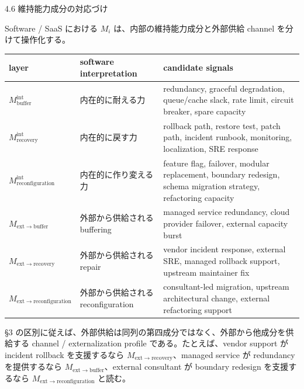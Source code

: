 \documentclass[12pt,a4paper]{article}
\begin{document}
4.6 維持能力成分の対応づけ

Software / SaaS における \(M_i\) は、内部の維持能力成分と外部供給 channel を分けて操作化する。

{\def\LTcaptype{table} %
\begin{longtable}[]{@{}
  >{\raggedright\arraybackslash}p{}
  >{\raggedright\arraybackslash}p{}
  >{\raggedright\arraybackslash}p{}@{}}
\toprule\noalign{}
\begin{minipage}[b]{\linewidth}\raggedright
layer
\end{minipage} & \begin{minipage}[b]{\linewidth}\raggedright
software interpretation
\end{minipage} & \begin{minipage}[b]{\linewidth}\raggedright
candidate signals
\end{minipage} \\
\midrule\noalign{}
\endhead
\bottomrule\noalign{}
\endlastfoot
\(M_{\mathrm{buffer}}^{\mathrm{int}}\) & 内在的に耐える力 & redundancy, graceful degradation, queue/cache slack, rate limit, circuit breaker, spare capacity \\
\(M_{\mathrm{recovery}}^{\mathrm{int}}\) & 内在的に戻す力 & rollback path, restore test, patch path, incident runbook, monitoring, localization, SRE response \\
\(M_{\mathrm{reconfiguration}}^{\mathrm{int}}\) & 内在的に作り変える力 & feature flag, failover, modular replacement, boundary redesign, schema migration strategy, refactoring capacity \\
\(M_{\mathrm{ext}\to\mathrm{buffer}}\) & 外部から供給される buffering & managed service redundancy, cloud provider failover, external capacity burst \\
\(M_{\mathrm{ext}\to\mathrm{recovery}}\) & 外部から供給される repair & vendor incident response, external SRE, managed rollback support, upstream maintainer fix \\
\(M_{\mathrm{ext}\to\mathrm{reconfiguration}}\) & 外部から供給される reconfiguration & consultant-led migration, upstream architectural change, external refactoring support \\
\end{longtable}
}

§3 の区別に従えば、外部供給は同列の第四成分ではなく、外部から他成分を供給する channel / externalization profile である。たとえば、vendor support が incident rollback を支援するなら \(M_{\mathrm{ext}\to\mathrm{recovery}}\)、managed service が redundancy を提供するなら \(M_{\mathrm{ext}\to\mathrm{buffer}}\)、external consultant が boundary redesign を支援するなら \(M_{\mathrm{ext}\to\mathrm{reconfiguration}}\) と読む。
\end{document}
